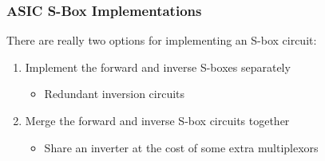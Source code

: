 \documentclass[10pt]{beamer}
\begin{document}
\begin{frame}
	\frametitle{ASIC S-Box Implementations}
	There are really two options for implementing an S-box circuit:
	\begin{enumerate}
		\item Implement the forward and inverse S-boxes separately
		\begin{itemize}
			\item Redundant inversion circuits
		\end{itemize}
		\pause 
		\item Merge the forward and inverse S-box circuits together
		\begin{itemize}
			\item Share an inverter at the cost of some extra multiplexors
		\end{itemize}
	\end{enumerate}
\end{frame}



\end{document}
